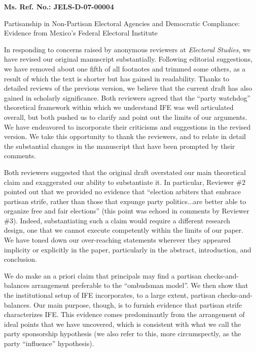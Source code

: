 \documentclass[12pt]{article}
\begin{document}
\noindent \textbf{Ms. Ref. No.:  JELS-D-07-00004}

\noindent Partisanship in Non-Partisan Electoral Agencies and Democratic Compliance: Evidence from Mexico's Federal Electoral Institute
\bigskip

In responding to concerns raised by anonymous reviewers at
\emph{Electoral Studies}, we have revised our original manuscript
substantially.  Following editorial suggestions, we have removed
about one fifth of all footnotes and trimmed some others, as a
result of which the text is shorter but has gained in readability.
Thanks to detailed reviews of the previous version, we believe that
the current draft has also gained in scholarly significance.  Both
reviewers agreed that the ``party watchdog'' theoretical framework
within which we understand IFE was well articulated overall, but
both pushed us to clarify and point out the limits of our arguments.
We have endeavored to incorporate their criticisms and suggestions
in the revised version. We take this opportunity to thank the
reviewers, and to relate in detail the substantial changes in the
manuscript that have been prompted by their comments.

Both reviewers suggested that the original draft overstated our main
theoretical claim and exaggerated our ability to substantiate it. In
particular, Reviewer \#2 pointed out that we provided no evidence
that ``election arbiters that embrace partisan strife, rather than
those that expunge party politics...are better able to organize free
and fair elections'' (this point was echoed in comments by Reviewer
\#3).  Indeed, substantiating such a claim would require a different
research design, one that we cannot execute competently within the
limits of our paper.  We have toned down our over-reaching
statements wherever they appeared implicity or explicitly in the
paper, particularly in the abstract, introduction, and conclusion.

We do make an a priori claim that principals may find a partisan
checks-and-balances arrangement preferable to the ``ombudsman
model''.  We then show that the institutional setup of IFE
incorporates, to a large extent, partisan checks-and-balances.  Our
main purpose, though, is to furnish evidence that partisan strife
characterizes IFE.  This evidence comes predominantly from the
arrangement of ideal points that we have uncovered, which is
consistent with what we call the party sponsorship hypothesis (we
also refer to this, more circumspectly, as the party ``influence''
hypothesis).
\end{document}
